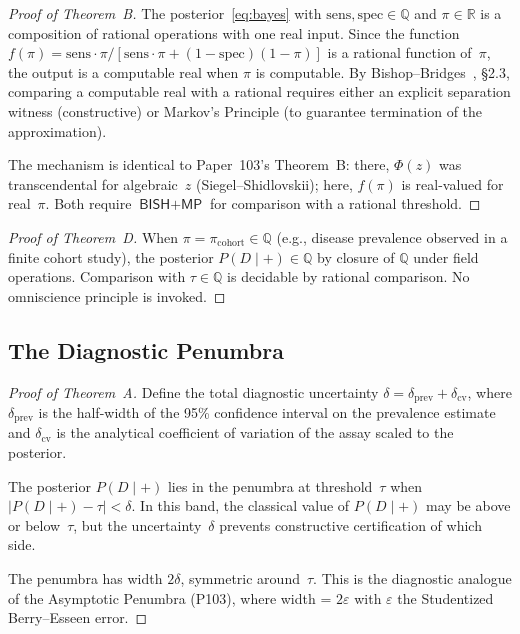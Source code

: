 \documentclass[11pt,a4paper]{article}
\theoremstyle{plain}
\theoremstyle{definition}
\newcommand{\BISH}{\textsf{BISH}}
\newcommand{\MP}{\textsf{MP}}
\newcommand{\Q}{\mathbb{Q}}
\newcommand{\R}{\mathbb{R}}
\begin{document}
\begin{proof}[Proof of Theorem~B]
The posterior~\eqref{eq:bayes} with $\mathrm{sens}, \mathrm{spec} \in \Q$ and $\pi \in \R$ is a composition of rational operations with one real input.  Since the function $f(\pi) = \mathrm{sens} \cdot \pi / [\mathrm{sens} \cdot \pi + (1-\mathrm{spec})(1-\pi)]$ is a rational function of~$\pi$, the output is a computable real when $\pi$ is computable.  By Bishop--Bridges~\cite{bishop-bridges}, \S2.3, comparing a computable real with a rational requires either an explicit separation witness (constructive) or Markov's Principle (to guarantee termination of the approximation).

The mechanism is identical to Paper~103's Theorem~B: there, $\Phi(z)$ was transcendental for algebraic~$z$ (Siegel--Shidlovskii); here, $f(\pi)$ is real-valued for real~$\pi$.  Both require $\BISH + \MP$ for comparison with a rational threshold.
\end{proof}

\begin{proof}[Proof of Theorem~D]
When $\pi = \pi_{\mathrm{cohort}} \in \Q$ (e.g., disease prevalence observed in a finite cohort study), the posterior $P(D\mid+) \in \Q$ by closure of $\Q$ under field operations.  Comparison with $\tau \in \Q$ is decidable by rational comparison.  No omniscience principle is invoked.
\end{proof}

\subsection{The Diagnostic Penumbra}

\begin{proof}[Proof of Theorem~A]
Define the total diagnostic uncertainty $\delta = \delta_{\mathrm{prev}} + \delta_{\mathrm{cv}}$, where $\delta_{\mathrm{prev}}$ is the half-width of the 95\% confidence interval on the prevalence estimate and $\delta_{\mathrm{cv}}$ is the analytical coefficient of variation of the assay scaled to the posterior.

The posterior $P(D\mid+)$ lies in the penumbra at threshold~$\tau$ when $|P(D\mid+) - \tau| < \delta$.  In this band, the classical value of $P(D\mid+)$ may be above or below~$\tau$, but the uncertainty~$\delta$ prevents constructive certification of which side.

The penumbra has width $2\delta$, symmetric around~$\tau$.  This is the diagnostic analogue of the Asymptotic Penumbra (P103), where width = $2\varepsilon$ with $\varepsilon$ the Studentized Berry--Esseen error.
\end{proof}
\end{document}

